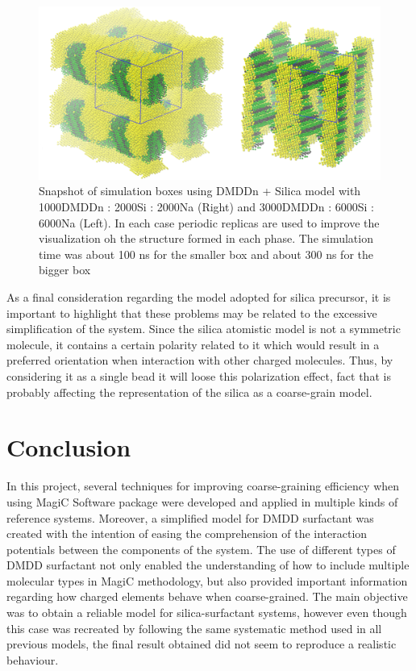\documentclass[10pt,a4paper,twoside]{article}
\begin{document}
   \begin{figure}[H]
  \begin{center}
	\includegraphics[width=.9 \textwidth]{./images/sibox}
	\caption{Snapshot of simulation boxes using DMDDn + Silica model with 1000DMDDn : 2000Si : 2000Na (Right) and 3000DMDDn : 6000Si : 6000Na (Left). In each case periodic replicas are used to improve the visualization oh the structure formed in each phase. The simulation time was about 100 ns for the smaller box and about 300 ns for the bigger box}
	\label{Fig:Sibox}
  \end{center}
\end{figure} 
  
   As a final consideration regarding the model adopted for silica precursor, it is important to highlight that these problems may be related to the excessive simplification of the system. Since the silica atomistic model is not a symmetric molecule, it contains a certain polarity related to it which would result in a preferred orientation when interaction with other charged molecules. Thus, by considering it as a single bead it will loose this polarization effect, fact that is probably affecting the representation of the silica as a coarse-grain model.

\section{Conclusion} 

In this project, several techniques for improving coarse-graining efficiency when using MagiC Software package were developed and applied in multiple kinds of reference systems. Moreover, a simplified model for DMDD surfactant was created with the intention of easing the comprehension of the interaction potentials between the components of the system. The use of different types of DMDD surfactant not only enabled the understanding of how to include multiple molecular types in MagiC methodology, but also provided important information regarding how charged elements behave  when coarse-grained. The main objective was to obtain a reliable model for silica-surfactant systems, however even though this case was recreated by following the same systematic method used in all previous models, the final result obtained did not seem to reproduce a realistic behaviour.
\end{document}
